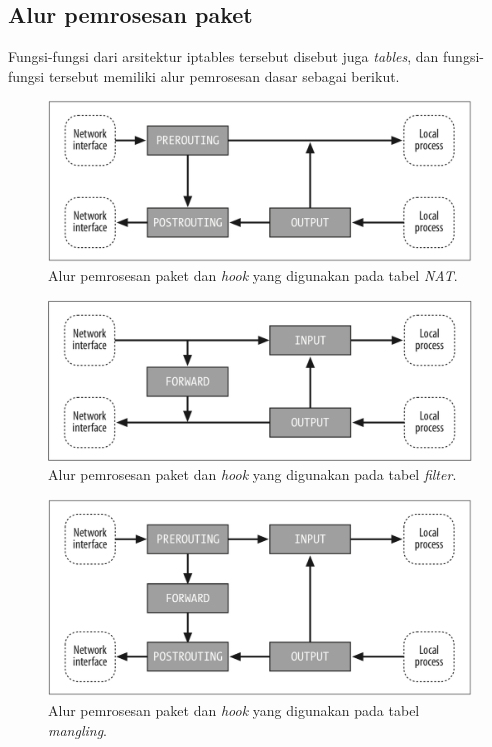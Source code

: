 \subsection{Alur pemrosesan paket}
Fungsi-fungsi dari arsitektur iptables tersebut disebut juga \textit{tables}, dan fungsi-fungsi tersebut memiliki alur pemrosesan dasar sebagai berikut.\\
\begin{figure}[H]
	\centering
	\includegraphics[width=\textwidth]{resources/nat_table.png}
	\caption{Alur pemrosesan paket dan \textit{hook} yang digunakan pada tabel \textit{NAT}.}
	\label{fig:packetflow_NAT}
\end{figure}

\begin{figure}[H]
	\centering
	\includegraphics[width=\textwidth]{resources/filter_table.png}
	\caption{Alur pemrosesan paket dan \textit{hook} yang digunakan pada tabel \textit{filter}.}
	\label{fig:packetflow_filter}
\end{figure}

\begin{figure}[H]
	\centering
	\includegraphics[width=\textwidth]{resources/mangling_table.png}
	\caption{Alur pemrosesan paket dan \textit{hook} yang digunakan pada tabel \textit{mangling}.}
	\label{fig:packetflow_mangling}
\end{figure}

